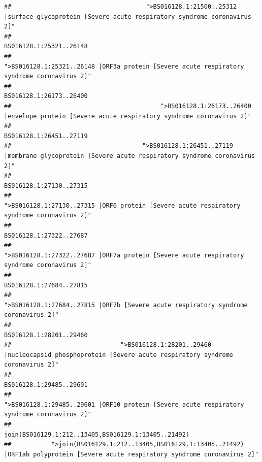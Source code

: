 \documentclass[
]{article}
\begin{document}
\begin{verbatim}
##                                     ">BS016128.1:21500..25312 |surface glycoprotein [Severe acute respiratory syndrome coronavirus 2]" 
##                                                                                                                BS016128.1:25321..26148 
##                                            ">BS016128.1:25321..26148 |ORF3a protein [Severe acute respiratory syndrome coronavirus 2]" 
##                                                                                                                BS016128.1:26173..26400 
##                                         ">BS016128.1:26173..26400 |envelope protein [Severe acute respiratory syndrome coronavirus 2]" 
##                                                                                                                BS016128.1:26451..27119 
##                                    ">BS016128.1:26451..27119 |membrane glycoprotein [Severe acute respiratory syndrome coronavirus 2]" 
##                                                                                                                BS016128.1:27130..27315 
##                                             ">BS016128.1:27130..27315 |ORF6 protein [Severe acute respiratory syndrome coronavirus 2]" 
##                                                                                                                BS016128.1:27322..27687 
##                                            ">BS016128.1:27322..27687 |ORF7a protein [Severe acute respiratory syndrome coronavirus 2]" 
##                                                                                                                BS016128.1:27684..27815 
##                                                    ">BS016128.1:27684..27815 |ORF7b [Severe acute respiratory syndrome coronavirus 2]" 
##                                                                                                                BS016128.1:28201..29460 
##                              ">BS016128.1:28201..29460 |nucleocapsid phosphoprotein [Severe acute respiratory syndrome coronavirus 2]" 
##                                                                                                                BS016128.1:29485..29601 
##                                            ">BS016128.1:29485..29601 |ORF10 protein [Severe acute respiratory syndrome coronavirus 2]" 
##                                                                                    join(BS016129.1:212..13405,BS016129.1:13405..21492) 
##           ">join(BS016129.1:212..13405,BS016129.1:13405..21492) |ORF1ab polyprotein [Severe acute respiratory syndrome coronavirus 2]" 

\end{verbatim}
\end{document}
